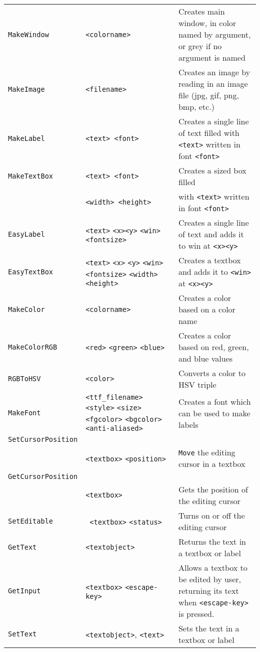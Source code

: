\begin{longtable}{p{3cm}p{3cm}p{6cm}}
\verb+MakeWindow+ &\verb+<colorname>+ &Creates main window, in color named by argument, or grey if no argument is named\\ 
\verb+MakeImage+ &\verb+<filename>+ &Creates an image by reading in an image file (jpg, gif, png, bmp, etc.)\\ 
\verb+MakeLabel+ &\verb+<text> <font>+&Creates a single line of text filled with \verb+<text>+ written in font \verb+<font>+\\ 
\verb+MakeTextBox+ &\verb+<text> <font>+ &Creates a sized box filled \\ 
&\verb+<width> <height>+& with \verb+<text>+ written in font \verb+<font>+ \\ 
\verb+EasyLabel+ &\verb+<text>+ \verb+<x>+\verb+<y>+ \verb+<win>+\verb+<fontsize>+&Creates a single line of text and adds it to win at \verb+<x>+\verb+<y>+\\ 
\verb+EasyTextBox+ &\verb+<text>+ \verb+<x>+ \verb+<y>+ \verb+<win>+ \verb+<fontsize>+ \verb+<width>+ \verb+<height>+&Creates a textbox and adds it to \verb+<win>+ at \verb+<x>+\verb+<y>+\\ 
\verb+MakeColor+ &\verb+<colorname>+ & Creates a color based on a color name\\ 
\verb+MakeColorRGB+ &\verb+<red>+ \verb+<green>+ \verb+<blue>+ & Creates a color based on red, green, and blue values\\ 
\verb+RGBToHSV+ &\verb+<color>+ & Converts a color to HSV triple\\ 
\verb+MakeFont+ &\verb+<ttf_filename>+ \verb+<style>+ \verb+<size>+ \verb+<fgcolor>+ \verb+<bgcolor>+ \verb+<anti-aliased>+&Creates a font which can be used to make labels \\ 
\verb+SetCursorPosition+\\
   &\verb+<textbox>+ \verb+<position>+ & \verb+Move+ the editing cursor in a textbox\\ 
\verb+GetCursorPosition+\\
   &\verb+<textbox>+ &Gets the position of the editing cursor\\ 
\verb+SetEditable+ &\verb+ <textbox>+ \verb+<status>+& Turns on or off the editing cursor\\ 
\verb+GetText+ &\verb+<textobject>+ &Returns the text in a textbox or label\\ 
\verb+GetInput+ &\verb+<textbox>+ \verb+<escape-key>+& Allows a textbox to be edited by user, returning its text when \verb+<escape-key>+ is pressed.\\ 
\verb+SetText+ &\verb+<textobject>+, \verb+<text>+ &Sets the text in a textbox or label\\ 

\end{longtable}
